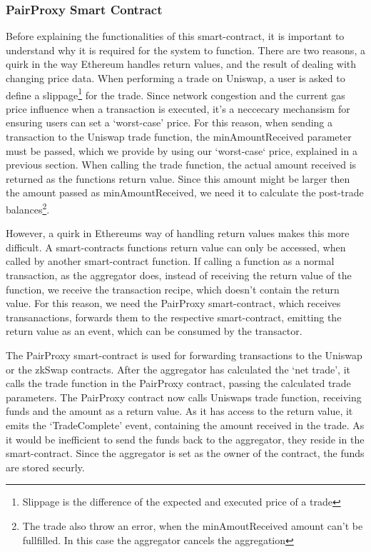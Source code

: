 \documentclass[../../thesis.tex]{subfiles}
\begin{document}
\subsubsection{PairProxy Smart Contract} \label{pairProxy}
Before explaining the functionalities of this smart-contract, it is important to understand why it is required for the system to function. There are two reasons, a quirk in the way Ethereum handles return values, and the result of dealing with changing price data.
When performing a trade on Uniswap, a user is asked to define a slippage\footnote{Slippage is the difference of the expected and executed price of a trade} for the trade. Since network congestion and the current gas price influence when a transaction is executed, it's a neccecary mechansism for ensuring users can set a `worst-case' price. For this reason, when sending a transaction to the Uniswap trade function, the minAmountReceived parameter must be passed, which we provide by using our `worst-case` price, explained in a previous section. When calling the trade function, the actual amount received is returned as the functions return value. Since this amount might be larger then the amount passed as minAmountReceived, we need it to calculate the post-trade balances\footnote{The trade also throw an error, when the minAmoutReceived amount can't be fullfilled. In this case the aggregator cancels the aggregation}. 

However, a quirk in Ethereums way of handling return values makes this more difficult. A smart-contracts functions return value can only be accessed, when called by another smart-contract function. If calling a function as a normal transaction, as the aggregator does, instead of receiving the return value of the function, we receive the transaction recipe, which doesn't contain the return value. For this reason, we need the PairProxy smart-contract, which receives transanactions, forwards them to the respective smart-contract, emitting the return value as an event, which can be consumed by the transactor. 

The PairProxy smart-contract is used for forwarding transactions to the Uniswap or the zkSwap contracts. After the aggregator has calculated the `net trade', it calls the trade function in the PairProxy contract, passing the calculated trade parameters. The PairProxy contract now calls Uniswaps trade function, receiving funds and the amount as a return value. As it has access to the return value, it emits the `TradeComplete' event, containing the amount received in the trade. As it would be inefficient to send the funds back to the aggregator, they reside in the smart-contract. Since the aggregator is set as the owner of the contract, the funds are stored securly.
\end{document}
